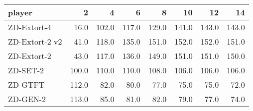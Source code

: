 \begin{tabular}{lrrrrrrr}
\toprule
         player &      2 &      4 &      6 &      8 &     10 &     12 &     14 \\
\midrule
    ZD-Extort-4 &   16.0 &  102.0 &  117.0 &  129.0 &  141.0 &  143.0 &  143.0 \\
 ZD-Extort-2 v2 &   41.0 &  118.0 &  135.0 &  151.0 &  152.0 &  152.0 &  151.0 \\
    ZD-Extort-2 &   43.0 &  117.0 &  136.0 &  149.0 &  151.0 &  151.0 &  150.0 \\
       ZD-SET-2 &  100.0 &  110.0 &  110.0 &  108.0 &  106.0 &  106.0 &  106.0 \\
        ZD-GTFT &  112.0 &   82.0 &   80.0 &   77.0 &   75.0 &   75.0 &   72.0 \\
       ZD-GEN-2 &  113.0 &   85.0 &   81.0 &   82.0 &   79.0 &   77.0 &   74.0 \\
\bottomrule
\end{tabular}
